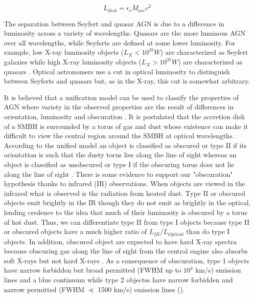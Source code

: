\documentclass[preprint]{aastex}
\begin{document}
\begin{equation}
L_{disk} = \epsilon_r \dot{M}_{acc} c^2
\end{equation}

The separation between Seyfert and quasar AGN is due to a difference in luminosity across a variety of wavelengths.  Quasars are the more luminous AGN over all wavelengths, while Seyferts are defined at some lower luminosity.  For example, low X-ray luminosity objects ($L_X < 10^{37} W$) are characterized as Seyfert galaxies while high X-ray luminosity objects ($L_X > 10^{37} W$) are characterized as quasars \citep{2006MNRAS.370.1479M}.  Optical astronomers use a cut in optical luminosity to distinguish between Seyferts and quasars but, as in the X-ray, this cut is somewhat arbitrary. 

It is believed that a unification model can be used to classify the properties of AGN where variety in the observed properties are the result of differences in orientation, luminosity and obscuration \citep{2002ApJ...571..218N}. It is postulated that the accretion disk of a SMBH is surrounded by a torus of gas and dust whose existence can make it difficult to view the central region around the SMBH at optical wavelengths.  According to the unified model an object is classified as obscured or type II if its orientation is such that the dusty torus lies along the line of sight whereas an object is classified as unobscured or type I if the obscuring torus does not lie along the line of sight  \citep{2006MNRAS.370.1479M}.  There is some evidence to support our "obscuration" hypothesis thanks to infrared (IR) observations.  When objects are viewed in the infrared what is observed is the radiation from heated dust.  Type II or obscured objects emit brightly in the IR though they do not emit as brightly in the optical, lending credence to the idea that much of their luminosity is obscured by a torus of hot dust. Thus, we can differentiate type II from type I objects because type II or obscured objects have a much higher ratio of $L_{IR}/L_{Optical}$ than do type I objects.  In addition, obscured object are expected to have hard X-ray spectra because obscuring gas along the line of sight from the central engine also absorbs soft X-rays but not hard X-rays \citep{2003AJ....126.2125Z}.  As a consequence of obscuration, type 1 objects have narrow forbidden but broad permitted (FWHM up to $10^4$ km/s) emission lines and a blue continuum while type 2 objectss have narrow forbidden and narrow permitted (FWHM $\preceq$ 1500 km/s) emission lines (\cite{hassen}).  
\end{document}
